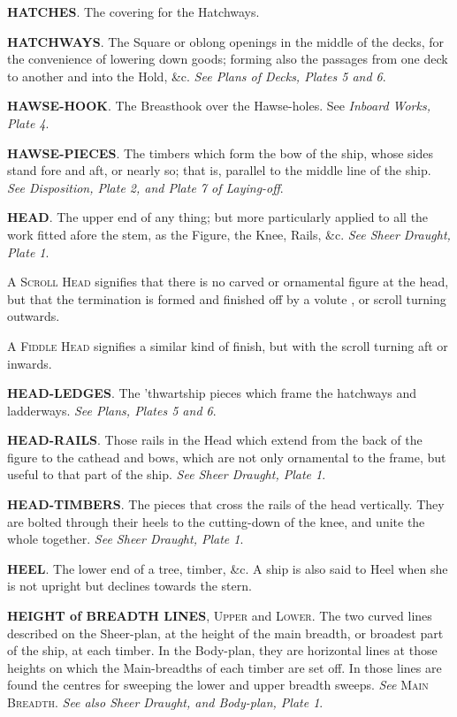 \textbf{HATCHES}. The covering for the Hatchways. 

\textbf{HATCHWAYS}. The Square or oblong openings in the middle of the decks, for the convenience of lowering down goods; forming also the passages from one deck to another and into the Hold, \&c. \textit{See Plans of Decks, Plates 5 and 6}. 

\textbf{HAWSE-HOOK}. The Breasthook over the Hawse-holes. See \textit{Inboard Works, Plate 4}. 

\textbf{HAWSE-PIECES}. The timbers which form the bow of the ship, whose sides stand fore and aft, or nearly so; that is, parallel to the middle line of the ship. \textit{See Disposition, Plate 2, and Plate 7 of Laying-off}. 

\textbf{HEAD}. The upper end of any thing; but more particularly applied to all the work fitted afore the stem, as the Figure, the Knee, Rails, \&c. \textit{See Sheer Draught, Plate 1}. 

\textsc{A Scroll Head} signifies that there is no carved or ornamental figure at the head, but that the termination is formed and finished off by a volute , or scroll turning outwards. 

\textsc{A Fiddle Head} signifies a similar kind of finish, but with the scroll turning aft or inwards. 

\textbf{HEAD-LEDGES}. The 'thwartship pieces which frame the hatchways and ladderways. \textit{See Plans, Plates 5 and 6}. 

\textbf{HEAD-RAILS}. Those rails in the Head which extend from the back of the figure to the cathead and bows, which are not only ornamental to the frame, but useful to that part of the ship. \textit{See Sheer Draught, Plate 1}. 

\textbf{HEAD-TIMBERS}. The pieces that cross the rails of the head vertically. They are bolted through their heels to the cutting-down of the knee, and unite the whole together. \textit{See Sheer Draught, Plate 1}. 

\textbf{HEEL}. The lower end of a tree, timber, \&c. A ship is also said to Heel when she is not upright but declines towards the stern. 

\textbf{HEIGHT of BREADTH LINES}, \textsc{Upper} and \textsc{Lower}. The two curved lines described on the Sheer-plan, at the height of the main breadth, or broadest part of the ship, at each timber. In the Body-plan, they are horizontal lines at those heights on which the Main-breadths of each timber are set off. In those lines are found the centres for sweeping the lower and upper breadth sweeps. \textit{See} \textsc{Main Breadth}. \textit{See also Sheer Draught, and Body-plan, Plate 1}. 

